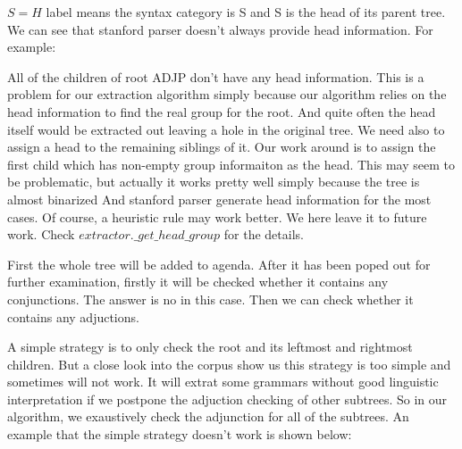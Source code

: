 \documentclass[a4paper]{article}
\begin{document}
\begin{center}
\end{center}

$S=H$ label means the syntax category is S and S is the head of its parent tree. We can see that stanford parser doesn't always provide head information. For example:
\begin{center}
\end{center}
All of the children of root ADJP don't have any head information. This is a problem for our extraction algorithm simply because our algorithm relies on the head information to find the real group for the root. And quite often the head itself would be extracted out leaving a hole in the original tree. We need also to assign a head to the remaining siblings of it. Our work around is to assign the first child which has non-empty group informaiton as the head. This may seem to be problematic, but actually it works pretty well simply because the tree is almost binarized And stanford parser generate head information for the most cases. Of course, a heuristic rule may work better. We here leave it to future work. Check $extractor.\_get\_head\_group$ for the details.

First the whole tree will be added to agenda. After it has been poped out for further examination, firstly it will be checked whether it contains any conjunctions. The answer is no in this case. Then we can check whether it contains any adjuctions.

A simple strategy is to only check the root and its leftmost and rightmost children. But a close look into the corpus show us this strategy is too simple and sometimes will not work. It will extrat some grammars without good linguistic interpretation if we postpone the adjuction checking of other subtrees. So in our algorithm, we exaustively check the adjunction for all of the subtrees. An example that the simple strategy doesn't work is shown below:
\end{document}
